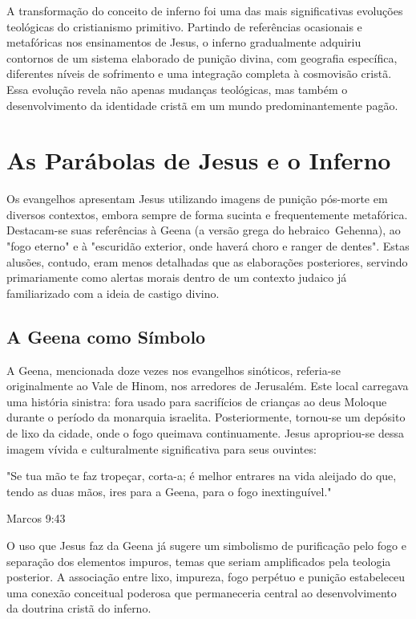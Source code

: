 A transformação do conceito de inferno foi uma das mais significativas evoluções teológicas do cristianismo primitivo. Partindo de referências ocasionais e metafóricas nos ensinamentos de Jesus, o inferno gradualmente adquiriu contornos de um sistema elaborado de punição divina, com geografia específica, diferentes níveis de sofrimento e uma integração completa à cosmovisão cristã. Essa evolução revela não apenas mudanças teológicas, mas também o desenvolvimento da identidade cristã em um mundo predominantemente pagão.

\section{As Parábolas de Jesus e o Inferno}

Os evangelhos apresentam Jesus utilizando imagens de punição pós-morte em diversos contextos, embora sempre de forma sucinta e frequentemente metafórica. Destacam-se suas referências à Geena (a versão grega do hebraico Gehenna), ao "fogo eterno" e à "escuridão exterior, onde haverá choro e ranger de dentes". Estas alusões, contudo, eram menos detalhadas que as elaborações posteriores, servindo primariamente como alertas morais dentro de um contexto judaico já familiarizado com a ideia de castigo divino.

\subsection{A Geena como Símbolo}

A Geena, mencionada doze vezes nos evangelhos sinóticos, referia-se originalmente ao Vale de Hinom, nos arredores de Jerusalém. Este local carregava uma história sinistra: fora usado para sacrifícios de crianças ao deus Moloque durante o período da monarquia israelita. Posteriormente, tornou-se um depósito de lixo da cidade, onde o fogo queimava continuamente. Jesus apropriou-se dessa imagem vívida e culturalmente significativa para seus ouvintes:

"Se tua mão te faz tropeçar, corta-a; é melhor entrares na vida aleijado do que, tendo as duas mãos, ires para a Geena, para o fogo inextinguível."

Marcos 9:43

O uso que Jesus faz da Geena já sugere um simbolismo de purificação pelo fogo e separação dos elementos impuros, temas que seriam amplificados pela teologia posterior. A associação entre lixo, impureza, fogo perpétuo e punição estabeleceu uma conexão conceitual poderosa que permaneceria central ao desenvolvimento da doutrina cristã do inferno.


